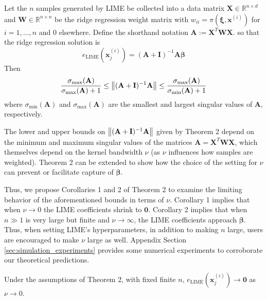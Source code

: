 \documentclass[mnsc,blindrev]{informs3}
\begin{document}
            \begin{theorem}
                 Let the $n$ samples generated by LIME be collected into a data matrix $\mathbf{X}\in\mathbb{R}^{n\times d}$ and $\mathbf{W}\in\mathbb{R}^{n\times n}$ be the ridge regression weight matrix with $w_{ii} = \pi(\boldsymbol{\xi},\mathbf{x}^{(i)})$ for $i=1,\ldots,n$ and 0 elsewhere. Define the shorthand notation $\mathbf{A}:= \mathbf{X}^T \mathbf{W}\mathbf{X}$. so that the ridge regression solution is
                \begin{equation*}
                    e_{\text{LIME}}(\mathbf{x}^{(i)}_j) = (\mathbf{A} + \mathbf{I})^{-1}\mathbf{A} \boldsymbol{\beta}
                \end{equation*}
                Then
                \begin{equation*}
                    \frac{\sigma_{\max}(\mathbf{A})}{\sigma_{\max}(\mathbf{A}) + 1} \leq \norm{(\mathbf{A} + \mathbf{I})^{-1}\mathbf{A}} \leq \frac{\sigma_{\max}(\mathbf{A})}{\sigma_{\min}(\mathbf{A}) + 1}
                \end{equation*}
                where $\sigma_{\min}(\mathbf{A})$ and $\sigma_{\max}(\mathbf{A})$ are the smallest and largest singular values of $\mathbf{A}$, respectively. 
            \end{theorem}
            The lower and upper bounds on $\norm{(\mathbf{A} + \mathbf{I})^{-1}\mathbf{A}}$ given by Theorem 2 depend on the minimum and maximum singular values of the matrices $\mathbf{A}=\mathbf{X}^T\mathbf{W}\mathbf{X}$, which themselves depend on the kernel bandwidth $\nu$ (as $\nu$ influences how samples are weighted). Theorem 2 can be extended to show how the choice of the setting for $\nu$ can prevent or facilitate capture of $\boldsymbol{\beta}$.
            
            Thus, we propose Corollaries 1 and 2 of Theorem 2 to examine the limiting behavior of the aforementioned bounds in terms of $\nu$. Corollary 1 implies that when $\nu \rightarrow 0$ the LIME coefficients shrink to $\mathbf{0}$. Corollary 2 implies that when $n \gg 1$ is very large but finite and $\nu \rightarrow \infty$, the LIME coefficients approach $\boldsymbol{\beta}$.  Thus, when setting LIME's hyperparameters, in addition to making $n$ large, users are encouraged to make $\nu$ large as well. Appendix Section \ref{sec:simulation_experiments} provides some numerical experiments to corroborate our theoretical predictions. 

            \begin{corollary}
                Under the assumptions of Theorem 2, with fixed finite $n$, $e_{\text{LIME}}(\mathbf{x}^{(i)}_j) \rightarrow \mathbf{0}$ as $\nu \rightarrow 0$. 
            \end{corollary}
            
\end{document}
